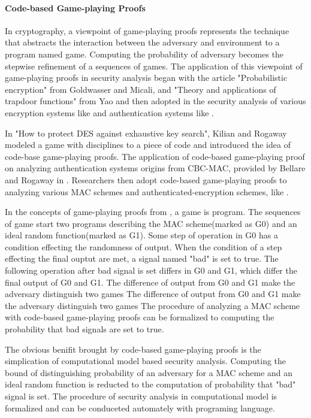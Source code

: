 \documentclass{article}
\begin{document}
\paragraph{Code-based Game-playing Proofs}
In cryptography, a viewpoint of game-playing proofs represents the technique that abstracts the interaction between the adversary and environment to a program named game. Computing the probability of adversary becomes the stepwise refinement of a sequences of games. 
The application of this viewpoint of game-playing proofs in security analysis
began with the article "Probabilistic encryption" from Goldwasser and
Micali\cite{goldwasser1984probabilistic}, and "Theory and applications of
trapdoor functions" from Yao \cite{yao1982theory}and then adopted in the
security analysis of various encryption systems like\cite{shoup2000using} and
authentication systems like \cite{bellare1990new}.  

In "How to protect DES against exhaustive key search"\cite{kilian1996protect}, Kilian and Rogaway
modeled a game with disciplines to a piece of code and introduced the idea of
code-base game-playing proofs. The application of code-based game-playing
proof on analyzing authentication systems origins from CBC-MAC, provided by
Bellare and Rogaway in \cite{code-game}. Researchers then adopt code-based game-playing
proofs to analyzing various MAC schemes and authenticated-encryption schemes,
like \cite{yasuda2011new}. 

In the concepts of game-playing proofs from \cite{code-game}, a game is program. The
sequences of game start two programs describing the MAC scheme(marked as G0) and an ideal
random function(marked as G1). Some step of operation in G0 has a condition
effecting the
randomness of output. When the
condition of a step effecting the final ouptut are met, a signal named "bad" is
set to true. The following operation after bad signal is set differs in G0 and
G1, which differ the final output of G0 and G1. The difference of output from G0
and G1 make the adversary distinguish two games  The difference of output from
G0 and G1 make the adversary distinguish two games  The procedure of analyzing a MAC scheme with code-based game-playing proofs can
be formalized to computing the probability that bad signals are set to true.

The obvious benifit brought by code-based game-playing proofs is the
simplication of computational model based security analysis. Computing the bound
of distinguishing probability of an adversary for a MAC scheme and an ideal
random function is reducted to the computation of probability that "bad" signal
is set. The procedure of security analysis in computational model is formalized
and can be conduceted automately with programing language.
\end{document}
